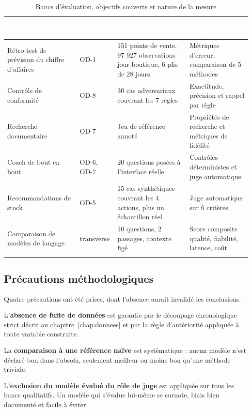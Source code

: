 \begin{longtable}{|P{3.1cm}|P{1.5cm}|P{4.3cm}|P{4.6cm}|}
\hline
{}
\textcolor{white}{\textbf{Banc}} &
\textcolor{white}{\textbf{Objectif}} &
\textcolor{white}{\textbf{Jeu de test}} &
\textcolor{white}{\textbf{Nature de la mesure}} \\
\hline
\endhead
\hline
\endfoot
\hline
\endlastfoot
Rétro-test de prévision du chiffre d'affaires & OD-1 & 151 points de vente, 97 927 observations jour-boutique, 6 plis de 28 jours & Métriques d'erreur, comparaison de 5 méthodes \\
\hline
Contrôle de conformité & OD-8 & 30 cas adversariaux couvrant les 7 règles & Exactitude, précision et rappel par règle \\
\hline
Recherche documentaire & OD-7 & Jeu de référence annoté & Propriétés de recherche et métriques de fidélité \\
\hline
Coach de bout en bout & OD-6, OD-7 & 20 questions posées à l'interface réelle & Contrôles déterministes et juge automatique \\
\hline
Recommandations de stock & OD-5 & 15 cas synthétiques couvrant les 4 actions, plus un échantillon réel & Juge automatique sur 6 critères \\
\hline
Comparaison de modèles de langage & transverse & 10 questions, 2 passages, contexte figé & Score composite qualité, fiabilité, latence, coût \\
\hline
\caption{Bancs d'évaluation, objectifs couverts et nature de la mesure}
\label{tab:bancs-chap5}
\end{longtable}
\endgroup

\subsection{Précautions méthodologiques}

Quatre précautions ont été prises, dont l'absence aurait invalidé les conclusions.

L'\textbf{absence de fuite de données} est garantie par le découpage chronologique strict décrit au chapitre~\ref{chap:donnees} et par la règle d'antériorité appliquée à toute variable construite.

La \textbf{comparaison à une référence naïve} est systématique : aucun modèle n'est déclaré bon dans l'absolu, seulement meilleur ou moins bon qu'une méthode triviale.

L'\textbf{exclusion du modèle évalué du rôle de juge} est appliquée sur tous les bancs qualitatifs. Un modèle qui s'évalue lui-même se surnote, biais bien documenté et facile à éviter.

